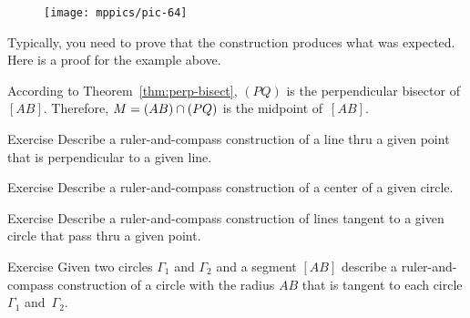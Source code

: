 \begin{figure}[!ht]
\centering
\texttt{[image: mppics/pic-64]}
\end{figure}

Typically, you need to prove that the construction produces what was expected. Here is a proof for the example above.

According to Theorem~\ref{thm:perp-bisect}, $(PQ)$ is the perpendicular bisector of~$[AB]$.
Therefore, $M=(AB)\cap(PQ)$ is the midpoint of~$[AB]$. 
\qeds



\begin{thm}{Exercise}\label{ex:construction-perpendicular}
Describe a ruler-and-compass construction of a line thru a given point that is perpendicular to a given line.
\end{thm}

\begin{thm}{Exercise}\label{ex:center}
Describe a ruler-and-compass construction of a center 
of a given circle.
\end{thm}

\begin{thm}{Exercise}\label{ex:tangent}
Describe a ruler-and-compass construction of lines tangent to a given circle that pass thru a given point.
\end{thm}

\begin{thm}{Exercise}\label{ex:tangent-circle}
Given two circles $\Gamma_1$ and $\Gamma_2$ and a segment $[AB]$
describe a ruler-and-compass construction of a circle with the radius $AB$ 
that is tangent to each circle $\Gamma_1$ and~$\Gamma_2$.
\end{thm}

